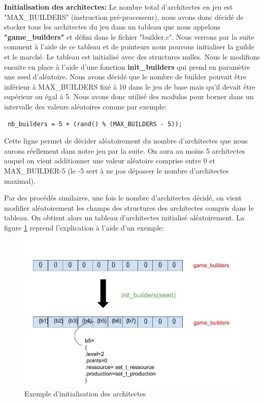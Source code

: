 \documentclass{article}
\begin{document}
        \vspace{1em} \textbf{Initialisation des architectes:} Le nombre total d'architectes en jeu est "MAX\_BUILDERS" (instruction pré-processeur), nous avons donc décidé de stocker tous les architectes du jeu dans un tableau que nous appelons \textbf{"game\_builders"} et défini dans le fichier "builder.c". Nous verrons par la suite comment à l'aide de ce tableau et de pointeurs nous pouvons initialiser la guilde et le marché.
        Le tableau est initialisé avec des structures nulles.
        Nous le modifions ensuite en place à l'aide d'une fonction \textbf{init\_builders} qui prend en paramètre une seed d'aléatoire. Nous avons décidé que le nombre de builder pouvait être inférieur à MAX\_BUILDERS fixé à 10 dans le jeu de base mais qu'il devait être supérieur ou égal à 5.
        Nous avons donc utilisé des modulos pour borner dans un intervalle des valeurs aléatoires comme par exemple:
        \begin{verbatim} nb_builders = 5 + (rand() % (MAX_BUILDERS - 5));
        \end{verbatim}
        
        Cette ligne permet de décider aléatoirement du nombre d'architectes que nous aurons réellement dans notre jeu par la suite. On aura au moins 5 architectes auquel on vient additionner une valeur aléatoire comprise entre 0 et MAX\_BUILDER-5 (le -5 sert à ne pas dépasser le nombre d'architectes maximal).

        Par des procédés similaires, une fois le nombre d'architectes décidé, on vient modifier aléatoirement les champs des structures des architectes compris dans le tableau. On obtient alors un tableau d'architectes initialisé aléatoirement. La figure \ref{init_builder} reprend l'explication à l'aide d'un exemple:

 
        \begin{figure}[!ht]
            \centering
            \includegraphics[width=0.7\linewidth]{Init builder.jpg}
            \caption{Exemple d'initialisation des architectes}
            \label{init_builder}
        \end{figure}
\end{document}
